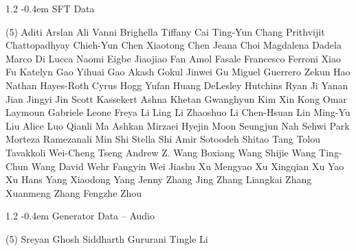 \documentclass{llmxive}
\makeatletter
\providecommand{\paragraph}{  \@startsection{paragraph}{4}{\z@}    {1\baselineskip \@plus .2\baselineskip}    {-0.4em}    {\normalfont\normalsize\bfseries}}
\makeatother
\begin{document}
\vspace{-0.32\baselineskip}\paragraph{\footnotesize SFT Data} \mbox{}
\vspace{-0.32\baselineskip}
\begingroup
\footnotesize
\begin{tasks}[label=\relax, label-width=0pt, item-indent=4pt](5)
\task Aditi 
\task Arslan Ali 
\task Vanni Brighella 
\task Tiffany Cai 
\task Ting-Yun Chang 
\task Prithvijit Chattopadhyay 
\task Chieh-Yun Chen 
\task Xiaotong Chen 
\task Jeana Choi 
\task Magdalena Dadela 
\task Marco Di Lucca 
\task Naomi Eigbe 
\task Jiaojiao Fan 
\task Amol Fasale 
\task Francesco Ferroni 
\task Xiao Fu 
\task Katelyn Gao 
\task Yihuai Gao 
\task Akash Gokul 
\task Jinwei Gu 
\task Miguel Guerrero 
\task Zekun Hao 
\task Nathan Hayes-Roth 
\task Cyrus Hogg 
\task Yufan Huang 
\task DeLesley Hutchins 
\task Ryan Ji 
\task Yanan Jian 
\task Jingyi Jin 
\task Scott Kassekert 
\task Ashna Khetan 
\task Gwanghyun Kim 
\task Xin Kong 
\task Omar Laymoun 
\task Gabriele Leone 
\task Freya Li 
\task Ling Li 
\task Zhaoshuo Li 
\task Chen-Hsuan Lin 
\task Ming-Yu Liu 
\task Alice Luo 
\task Qianli Ma 
\task Ashkan Mirzaei 
\task Hyejin Moon 
\task Seungjun Nah 
\task Sehwi Park 
\task Morteza Ramezanali 
\task Min Shi 
\task Stella Shi 
\task Amir Sotoodeh 
\task Shitao Tang 
\task Tolou Tavakkoli 
\task Wei-Cheng Tseng 
\task Andrew Z. Wang 
\task Boxiang Wang 
\task Shijie Wang 
\task Ting-Chun Wang 
\task David Wehr 
\task Fangyin Wei 
\task Jiashu Xu 
\task Mengyao Xu 
\task Xingqian Xu 
\task Yao Xu 
\task Hans Yang 
\task Xiaodong Yang 
\task Jenny Zhang 
\task Jing Zhang 
\task Liangkai Zhang 
\task Xuanmeng Zhang 
\task Fengzhe Zhou 
\end{tasks}
\endgroup

\paragraph{Generator Data -- Audio} \mbox{}
\begingroup
\footnotesize
\begin{tasks}[label=\relax, label-width=0pt, item-indent=4pt](5)
\task Sreyan Ghosh
\task Siddharth Gururani
\task Tingle Li
\end{tasks}
\endgroup
\end{document}

